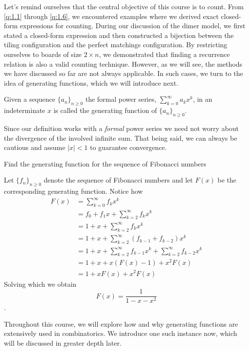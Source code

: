 Let's remind ourselves that the central objective of this course is to count. From \cref{q:1.1} through \cref{q:1.6}, we encountered examples where we derived exact closed-form expressions for counting. During our discussion of the dimer model, we first stated a closed-form expression and then constructed a bijection between the tiling configuration and the perfect matchings configuration. By restricting ourselves to boards of size $2 \times n$, we demonstrated that finding a recurrence relation is also a valid counting technique. However, as we will see, the methods we have discussed so far are not always applicable. In such cases, we turn to the idea of generating functions, which we will introduce next.

\begin{definition}
	Given a sequence $\{a_{n}\}_{n \ge 0}$ the formal power series, $\sum_{k=0}^{\infty}a_{k}x^k$, in an indeterminate $x$ is called the generating function of $\{a_{n}\}_{n \ge 0}$.
\end{definition}

Since our definition works with a \textit{formal} power series we need not worry about the divergence of the involved infinite sum. That being said, we can always be cautious and assume $|x|<1$ to guarantee convergence. 

\begin{question}
	Find the generating function for the sequence of Fibonacci numbers 
\end{question}
Let $\{f_{n}\}_{n \ge 0}$ denote the sequence of Fibonacci numbers and let $F\left( x \right)$ be the corresponding generating function. Notice how 
\begin{align*}
	F\left( x \right) &= \sum_{k=0}^{\infty} f_{k}x^k \\
	&= f_{0}+f_{1}x+\sum_{k=2}^{\infty}f_{k}x^k \\
	&= 1+x+\sum_{k=2}^{\infty}f_{k}x^k \\
	&= 1+x+\sum_{k=2}^\infty \left( f_{k-1}+f_{k-2} \right) x^k \\
	&= 1+x+\sum_{k=2}^{\infty} f_{k-1}x^k + \sum_{k=2}^{\infty} f_{k-2}x^k \\
	&= 1+x+x\left( F\left( x \right) -1 \right) + x^2F\left( x \right)  \\
	&= 1+xF\left( x \right)+x^2F\left( x \right)
\end{align*}
Solving which we obtain \[
F\left( x \right) = \frac{1}{1-x-x^2}
\].

Throughout this course, we will explore how and why generating functions are extensively used in combinatorics. We introduce one such instance now, which will be discussed in greater depth later.

